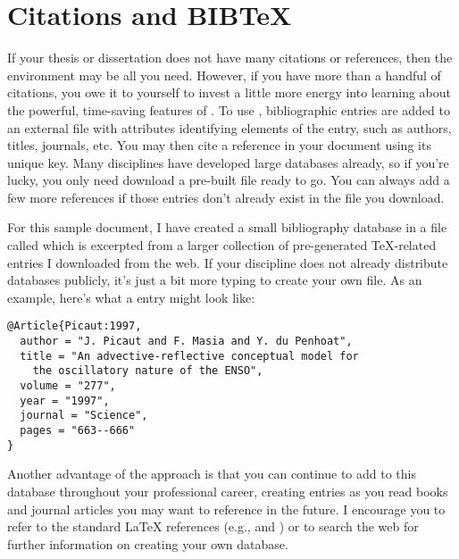 \section{Citations and B{\small IB}\TeX}
If your thesis or dissertation does not have many citations or
references, then the  environment may be all you
need. However, if you have more than a handful of citations, you owe
it to yourself to invest a little more energy into learning about the
powerful, time-saving features of \BibTeX.  To use \BibTeX,
bibliographic entries are added to an external file with attributes
identifying elements of the entry, such as authors, titles, journals,
etc.  You may then cite a reference in your document using its unique
key.  Many disciplines have developed large \BibTeX{} databases
already, so if you're lucky, you only need download a pre-built file
ready to go.  You can always add a few more references if those
entries don't already exist in the file you download.

For this sample document, I have created a small \BibTeX{}
bibliography database in a file called  which is
excerpted from a larger collection of pre-generated \TeX-related
entries I downloaded from the web.  If your discipline does not
already distribute \BibTeX{} databases publicly, it's just a bit
more typing to create your own \BibTeX{} file.  As an example, here's
what a \BibTeX{} entry might look like:
\begin{verbatim}
@Article{Picaut:1997,                  
  author = "J. Picaut and F. Masia and Y. du Penhoat",
  title = "An advective-reflective conceptual model for
    the oscillatory nature of the ENSO",
  volume = "277",
  year = "1997",
  journal = "Science",
  pages = "663--666"
}
\end{verbatim}

Another advantage of the \BibTeX{} approach is that you can continue
to add to this database throughout your professional career, creating
entries as you read books and journal articles you may want to
reference in the future.  I encourage you to refer to the
standard \LaTeX{} references (e.g., \cite{greenwade93}
and \citet{greenwade93}) or to search the web for further
information on creating your own \BibTeX{} database.
%

